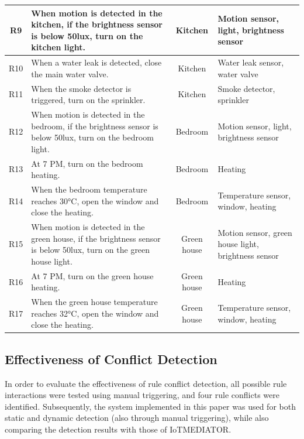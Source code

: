 \begin{table}[htbp]
\begin{adjustbox}{width=\textwidth}
\begin{tabular}{c|l|c|l}
		\hline
		R9 & When motion is detected in the kitchen, if the brightness sensor is below 50lux, turn on the kitchen light. & Kitchen & Motion sensor, light, brightness sensor \\
		\hline
		R10 & When a water leak is detected, close the main water valve. & Kitchen & Water leak sensor, water valve \\
		\hline
		R11 & When the smoke detector is triggered, turn on the sprinkler. & Kitchen & Smoke detector, sprinkler \\
		\hline
		R12 & When motion is detected in the bedroom, if the brightness sensor is below 50lux, turn on the bedroom light. & Bedroom & Motion sensor, light, brightness sensor \\
		\hline
		R13 & At 7 PM, turn on the bedroom heating. & Bedroom & Heating \\
		\hline
		R14 & When the bedroom temperature reaches 30°C, open the window and close the heating. & Bedroom & Temperature sensor, window, heating \\
		\hline
		R15 & When motion is detected in the green house, if the brightness sensor is below 50lux, turn on the green house light. & Green house & Motion sensor, green house light, brightness sensor\\
		\hline
		R16 & At 7 PM, turn on the green house heating. & Green house & Heating \\
		\hline
		R17 & When the green house temperature reaches 32°C, open the window and close the heating. & Green house & Temperature sensor, window, heating \\
		\hline
	\end{tabular}
	\end{adjustbox}
\end{table}

\subsection{Effectiveness of Conflict Detection}
In order to evaluate the effectiveness of rule conflict detection, all possible rule interactions were tested using manual triggering, and four rule conflicts were identified. Subsequently, the system implemented in this paper was used for both static and dynamic detection (also through manual triggering), while also comparing the detection results with those of IoTMEDIATOR.

